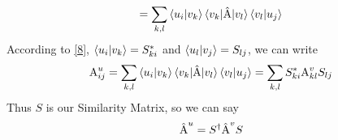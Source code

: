 \documentclass[12pt]{article}
\begin{document}
\begin{equation*}
    = \sum_{k,l} \braket{u_{i}|v_{k}} \braket{v_{k}| \hat{\textnormal{A}} | v_{l}} \braket{v_{l}| u_{j}}
\end{equation*}
According to \ref{8}, $\braket{u_{i}|v_{k}} = S_{ki}^{*}$ and $\braket{u_{l}| v_{j}} = S_{lj}$,
we can write
\begin{equation}
    \textnormal{A}_{ij}^{u} = \sum_{k,l} \braket{u_{i}|v_{k}} \braket{v_{k}| \hat{\textnormal{A}} | v_{l}} \braket{v_{l}| u_{j}} = \sum_{k,l} S_{ki}^{*} \textnormal{A}_{kl}^{v} S_{lj}
\end{equation}
Thus $S$ is our Similarity Matrix, so we can say
\begin{equation}
    \hat{\textnormal{A}}^{u} = S^{\dagger}\hat{\textnormal{A}}^{v}S
\end{equation}
\end{document}
